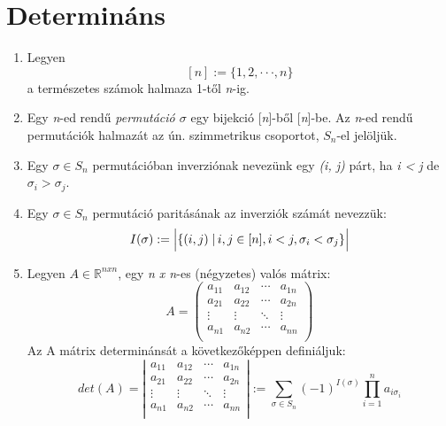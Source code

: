 \documentclass{article}
\begin{document}
\section{Determináns}
\begin{enumerate}[label=\alph*)]
\item Legyen 
\[[n]:=\{1,2,\cdot\cdot\cdot ,n\}\]
a természetes számok halmaza 1-től \textit{n}-ig.
\item Egy \textit{n}-ed rendű \textit{permutáció $\sigma $} egy bijekció [\textit{n}]-ből [\textit{n}]-be. Az \textit{n}-ed rendű permutációk halmazát az ún. szimmetrikus csoportot, 
\(S_n\)-el jelöljük.
\item Egy $\sigma \in S_n$ permutációban inverziónak nevezünk egy \textit{(i, j)} párt, ha \textit{i < j}
de $\sigma_i > \sigma_j$.
\item Egy $\sigma \in S_n$ permutáció paritásának az inverziók számát nevezzük:
\[I(\sigma):=\Bigl\vert\{(i,j)\left.\right\vert i,j \in [n],i<j, \sigma_i < \sigma_j \}\Bigr\vert\]
\item Legyen $A \in \mathbb{R}^{nxn}$, egy \textit{n x n}-es (négyzetes) valós mátrix:
\[A= \left( \begin{matrix}
a_{11} & a_{12}& \cdots & a_{1n}\\
a_{21} & a_{22}& \cdots & a_{2n}\\
\vdots & \vdots & \ddots & \vdots \\
a_{n1} & a_{n2}& \cdots & a_{nn}\\
\end{matrix} \right)\]
Az A mátrix determinánsát a következőképpen definiáljuk:
\begin{equation}det(A)= \left\vert \begin{matrix}
a_{11} & a_{12}& \cdots & a_{1n}\\
a_{21} & a_{22}& \cdots & a_{2n}\\
\vdots & \vdots & \ddots & \vdots \\
a_{n1} & a_{n2}& \cdots & a_{nn}\\
\end{matrix} \right\vert 
:= \sum_{\sigma \in S_n} (-1)^{I(\sigma)}\prod_{i=1}^n a_{i\sigma_i}\end{equation}
\end{enumerate}

\pagebreak
\end{document}
